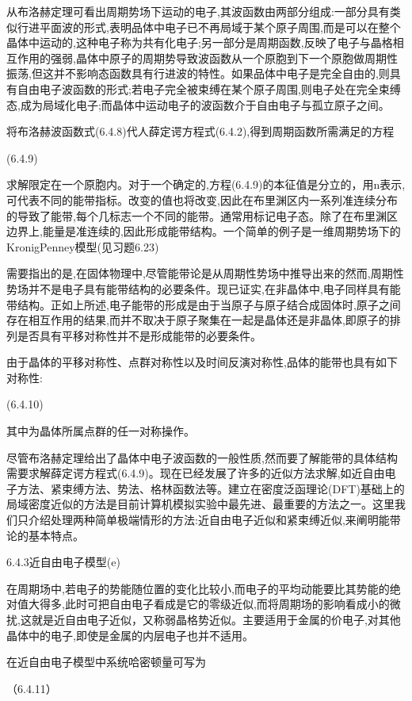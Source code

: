 从布洛赫定理可看出周期势场下运动的电子,其波函数由两部分组成:一部分具有类似行进平面波的形式,表明品体中电子已不再局域于某个原子周围,而是可以在整个晶体中运动的,这种电子称为共有化电子;另一部分是周期函数,反映了电子与晶格相互作用的强弱,晶体中原子的周期势导致波函数从一个原胞到下一个原胞做周期性振荡,但这并不影响态函数具有行进波的特性。如果品体中电子是完全自由的,则具有自由电子波函数的形式;若电子完全被束缚在某个原子周围,则电子处在完全束缚态,成为局域化电子;而晶体中运动电子的波函数介于自由电子与孤立原子之间。

将布洛赫波函数式(6.4.8)代人薛定谔方程式(6.4.2),得到周期函数所需满足的方程

 	(6.4.9)

求解限定在一个原胞内。对于一个确定的,方程(6.4.9)的本征值是分立的，用n表示,可代表不同的能带指标。改变的值也将改变,因此在布里渊区内一系列准连续分布的导致了能带,每个几标志一个不同的能带。通常用标记电子态。除了在布里渊区边界上,能量是准连续的,因此形成能带结构。一个简单的例子是一维周期势场下的KronigPenney模型(见习题6.23)

需要指出的是,在固体物理中,尽管能带论是从周期性势场中推导出来的然而,周期性势场并不是电子具有能带结构的必要条件。现已证实,在非晶体中,电子同样具有能带结构。正如上所述,电子能带的形成是由于当原子与原子结合成固体时,原子之间存在相互作用的结果,而并不取决于原子聚集在一起是晶体还是非晶体,即原子的排列是否具有平移对称性并不是形成能带的必要条件。

由于晶体的平移对称性、点群对称性以及时间反演对称性,品体的能带也具有如下对称性:

	(6.4.10)

其中为晶体所属点群的任一对称操作。

尽管布洛赫定理给出了晶体中电子波函数的一般性质,然而要了解能带的具体结构需要求解薛定谔方程式(6.4.9)。现在已经发展了许多的近似方法求解,如近自由电子方法、紧束缚方法、势法、格林函数法等。建立在密度泛函理论(DFT)基础上的局域密度近似的方法是目前计算机模拟实验中最先进、最重要的方法之一。这里我们只介绍处理两种简单极端情形的方法:近自由电子近似和紧束缚近似,来阐明能带论的基本特点。

6.4.3近自由电子模型(e)

在周期场中,若电子的势能随位置的变化比较小,而电子的平均动能要比其势能的绝对值大得多,此时可把自由电子看成是它的零级近似,而将周期场的影响看成小的微扰,这就是近自由电子近似，又称弱晶格势近似。主要适用于金属的价电子,对其他晶体中的电子,即使是金属的内层电子也并不适用。

在近自由电子模型中系统哈密顿量可写为

	（6.4.11）

